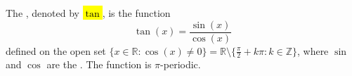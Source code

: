 \begin{definition} \label{definition:real_tangent_function}
The , denoted by \hl{$\tan$}, is the function
$$\tan(x) = \frac{\sin(x)}{\cos(x)}$$
defined on the open set $\{x \in \mathbb{R} : \cos(x) \neq 0\} = \mathbb{R} \setminus \{\frac{\pi}{2} + k\pi : k \in \mathbb{Z}\}$, where $\sin$ and $\cos$ are the . The function is $\pi$-periodic.
\end{definition}
